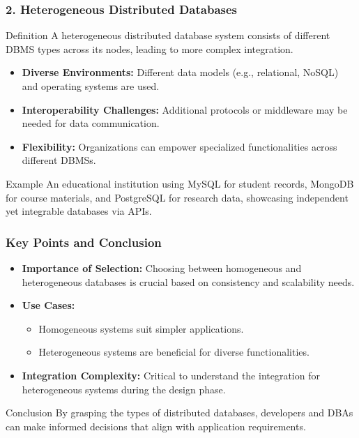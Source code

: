 \documentclass[aspectratio=169]{beamer}
\begin{document}
\begin{frame}[fragile]
    \frametitle{2. Heterogeneous Distributed Databases}
    \begin{block}{Definition}
        A heterogeneous distributed database system consists of different DBMS types across its nodes, 
        leading to more complex integration.
    \end{block}
    
    \begin{itemize}
        \item \textbf{Diverse Environments:} Different data models (e.g., relational, NoSQL) and operating systems are used.
        \item \textbf{Interoperability Challenges:} Additional protocols or middleware may be needed for data communication.
        \item \textbf{Flexibility:} Organizations can empower specialized functionalities across different DBMSs.
    \end{itemize}
    
    \begin{block}{Example}
        An educational institution using MySQL for student records, MongoDB for course materials, 
        and PostgreSQL for research data, showcasing independent yet integrable databases via APIs.
    \end{block}
\end{frame}

\begin{frame}[fragile]
    \frametitle{Key Points and Conclusion}
    \begin{itemize}
        \item \textbf{Importance of Selection:} Choosing between homogeneous and heterogeneous databases is crucial based on consistency and scalability needs.
        \item \textbf{Use Cases:} 
            \begin{itemize}
                \item Homogeneous systems suit simpler applications.
                \item Heterogeneous systems are beneficial for diverse functionalities.
            \end{itemize}
        \item \textbf{Integration Complexity:} Critical to understand the integration for heterogeneous systems during the design phase.
    \end{itemize}
    
    \begin{block}{Conclusion}
        By grasping the types of distributed databases, developers and DBAs can make informed decisions that align with application requirements.
    \end{block}
\end{frame}
\end{document}
